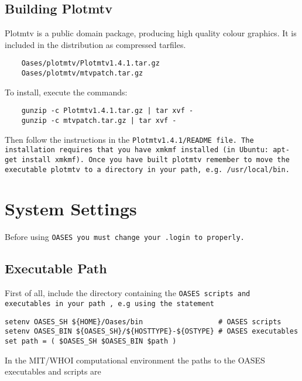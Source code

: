\subsection{Building Plotmtv}
\label{sec:plotmtv}

Plotmtv is a public domain package, producing high quality colour
graphics. It is included in the distribution as compressed tarfiles.

\begin{verbatim}
	Oases/plotmtv/Plotmtv1.4.1.tar.gz
	Oases/plotmtv/mtvpatch.tar.gz
\end{verbatim}

To install, execute the commands:

\begin{verbatim}
	gunzip -c Plotmtv1.4.1.tar.gz | tar xvf -
	gunzip -c mtvpatch.tar.gz | tar xvf -
\end{verbatim}

Then follow the instructions in the \tt Plotmtv1.4.1/README \rm
file. The installation requires that you have \tt xmkmf \rm installed
(in Ubuntu: apt-get install xmkmf). Once you have built plotmtv
remember to move the executable \tt plotmtv \rm to a directory in your
path, e.g. \tt /usr/local/bin. \rm

\newpage
\section{System Settings}
\label{sec:sysset} 

Before using \tt OASES \rm you must change your \tt .login \rm to
properly. 

\subsection{Executable Path}

First of all, include the directory containing the \tt OASES
\rm scripts and executables in your \tt path \rm, e.g using the
statement


\begin{verbatim}
setenv OASES_SH ${HOME}/Oases/bin                  # OASES scripts
setenv OASES_BIN ${OASES_SH}/${HOSTTYPE}-${OSTYPE} # OASES executables
set path = ( $OASES_SH $OASES_BIN $path ) 
\end{verbatim}

In the MIT/WHOI
computational environment the paths to the OASES executables and scripts are


